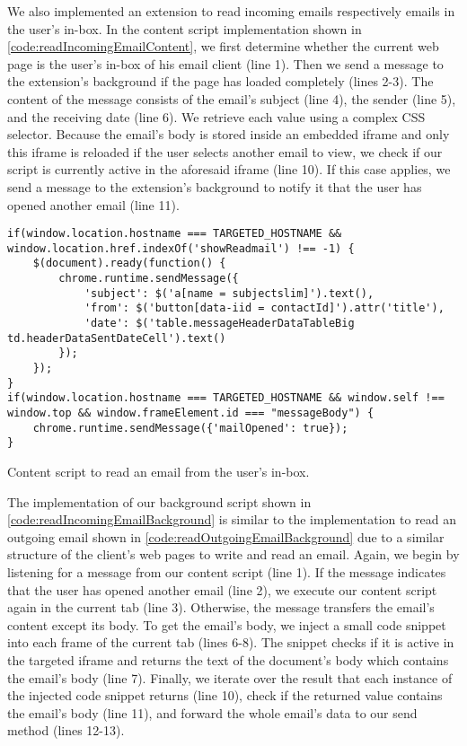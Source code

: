 	We also implemented an extension to read incoming emails respectively emails in the user's in-box. In the content script implementation shown in \autoref{code:readIncomingEmailContent}, we first determine whether the current web page is the user's in-box of his email client (line 1). Then we send a message to the extension's background if the page has loaded completely (lines 2-3). The content of the message consists of the email's subject (line 4), the sender (line 5), and the receiving date (line 6). We retrieve each value using a complex CSS selector. Because the email's body is stored inside an embedded iframe and only this iframe is reloaded if the user selects another email to view, we check if our script is currently active in the aforesaid iframe (line 10). If this case applies, we send a message to the extension's background to notify it that the user has opened another email (line 11).
	
	\begin{code}
		\begin{lstlisting}
if(window.location.hostname === TARGETED_HOSTNAME && window.location.href.indexOf('showReadmail') !== -1) {
	$(document).ready(function() {
		chrome.runtime.sendMessage({
			'subject': $('a[name = subjectslim]').text(),
			'from': $('button[data-iid = contactId]').attr('title'),
			'date': $('table.messageHeaderDataTableBig td.headerDataSentDateCell').text()
		});
	});
}
if(window.location.hostname === TARGETED_HOSTNAME && window.self !== window.top && window.frameElement.id === "messageBody") {
	chrome.runtime.sendMessage({'mailOpened': true});
}
\end{lstlisting}	
		\caption{Content script to read an email from the user's in-box.}
		\label{code:readIncomingEmailContent}
	\end{code}
	
	The implementation of our background script shown in \autoref{code:readIncomingEmailBackground} is similar to the implementation to read an outgoing email shown in \autoref{code:readOutgoingEmailBackground} due to a similar structure of the client's web pages to write and read an email. Again, we begin by listening for a message from our content script (line 1). If the message indicates that the user has opened another email (line 2), we execute our content script again in the current tab (line 3). Otherwise, the message transfers the email's content except its body. To get the email's body, we inject a small code snippet into each frame of the current tab (lines 6-8). The snippet checks if it is active in the targeted iframe and returns the text of the document's body which contains the email's body (line 7). Finally, we iterate over the result that each instance of the injected code snippet returns (line 10), check if the returned value contains the email's body (line 11), and forward the whole email's data to our send method (lines 12-13).
	
